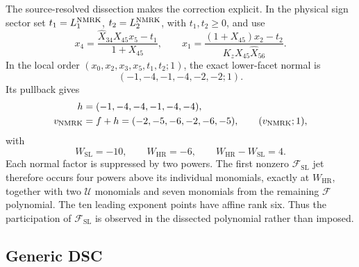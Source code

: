 \documentclass[11pt]{article}
\newcommand{\F}{\mathcal F}
\newcommand{\U}{\mathcal U}
\newcommand{\SL}{\mathrm{SL}}
\newcommand{\HR}{\mathrm{HR}}
\newcommand{\hX}{\widehat X}
\begin{document}
The source-resolved dissection makes the correction explicit.  In the
physical sign sector set \(t_1=L_1^{\rm NMRK}\),
\(t_2=L_2^{\rm NMRK}\), with \(t_1,t_2\geq0\), and use
\begin{equation}
 x_4=\frac{\hX_{34}X_{45}x_5-t_1}{1+X_{45}},
 \qquad
 x_1=\frac{(1+X_{45})x_2-t_2}{K_zX_{45}\hX_{56}}.
 \label{eq:nmrk-local-map}
\end{equation}
In the local order \((x_0,x_2,x_3,x_5,t_1,t_2;1)\), the exact lower-facet
normal is
\begin{equation}
 (-1,-4,-1,-4,-2,-2;1).
 \label{eq:nmrk-local-vector}
\end{equation}
Its pullback gives
\begin{align}
 h&=(-1,-4,-4,-1,-4,-4),\nonumber\\
 v_{\rm NMRK}&=f+h=(-2,-5,-6,-2,-6,-5),
 \qquad (v_{\rm NMRK};1),
 \label{eq:nmrk-vector}
\end{align}
with
\begin{equation}
 W_{\SL}=-10,\qquad W_{\HR}=-6,\qquad
 W_{\HR}-W_{\SL}=4.
 \label{eq:nmrk-gap}
\end{equation}
Each normal factor is suppressed by two powers.  The first nonzero
\(\F_{\SL}\) jet therefore occurs four powers above its individual
monomials, exactly at \(W_{\HR}\), together with two \(\U\) monomials and
seven monomials from the remaining \(\F\) polynomial.  The ten leading
exponent points have affine rank six.  Thus the participation of
\(\F_{\SL}\) is observed in the dissected polynomial rather than imposed.

\subsection{Generic DSC}
\end{document}
